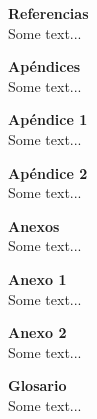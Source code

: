 
\textbf{{\Huge Referencias}}\\

Some text...

\newpage

\textbf{{\Huge Apéndices}}\\

Some text...

\textbf{{\LARGE Apéndice 1}}\\

Some text...

\textbf{{\LARGE Apéndice 2}}\\

Some text...

\newpage

\textbf{{\Huge Anexos}}\\

Some text...

\textbf{{\LARGE Anexo 1}}\\

Some text...

\textbf{{\LARGE Anexo 2}}\\

Some text...

\newpage

\textbf{{\Huge Glosario}}\\

Some text...
